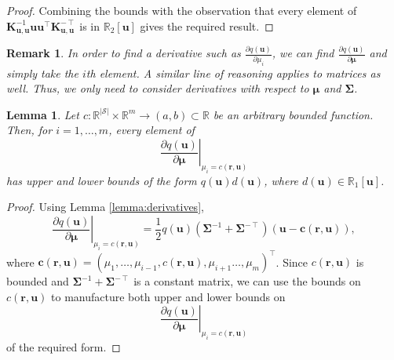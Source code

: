 \documentclass{mpaper}
\newtheorem{lemma}[theorem]{Lemma}
\newtheorem{remark}[theorem]{Remark}
\newcommand{\Kuu}{\mathbf{K}_{\mathbf{u},\mathbf{u}}}
\begin{document}
\begin{proof}
  Combining the bounds with the observation that
  every element of
  $\Kuu^{-1}\mathbf{u}\mathbf{u}^\intercal\Kuu^{-\intercal}$ is in
  $\mathbb{R}_2[\mathbf{u}]$ gives the required result.
\end{proof}

\begin{remark}
  In order to find a derivative such as $\frac{\partial q(\mathbf{u})}{\partial
    \mu_i}$, we can find $\frac{\partial q(\mathbf{u})}{\partial \bm\mu}$ and
  simply take the $i$th element. A similar line of reasoning applies to matrices
  as well. Thus, we only need to consider derivatives with respect to $\bm\mu$
  and $\bm\Sigma$.
\end{remark}

\begin{lemma} \label{lemma:bound2}
  Let $c : \mathbb{R}^{|\mathcal{S}|} \times \mathbb{R}^m \to (a, b) \subset
  \mathbb{R}$ be an arbitrary bounded function. Then, for $i = 1, \dots, m$,
  every element of
  \[
    \left. \frac{\partial q(\mathbf{u})}{\partial \bm\mu} \right|_{\mu_i =
      c(\mathbf{r}, \mathbf{u})}
  \]
  has upper and lower bounds of the form $q(\mathbf{u})d(\mathbf{u})$,
  where $d(\mathbf{u}) \in \mathbb{R}_1[\mathbf{u}]$.
\end{lemma}
\begin{proof}
  Using Lemma \ref{lemma:derivatives},
  \[
    \left. \frac{\partial q(\mathbf{u})}{\partial \bm\mu} \right|_{\mu_i =
      c(\mathbf{r}, \mathbf{u})} = \frac{1}{2}q(\mathbf{u})(\bm\Sigma^{-1} +
    \bm\Sigma^{-\intercal})(\mathbf{u} - \mathbf{c}(\mathbf{r}, \mathbf{u})),
  \]
  where $\mathbf{c}(\mathbf{r}, \mathbf{u}) = (\mu_1, \dots, \mu_{i - 1},
  c(\mathbf{r}, \mathbf{u}), \mu_{i + 1} \dots, \mu_m)^\intercal$. Since
  $c(\mathbf{r}, \mathbf{u})$ is bounded and $\bm\Sigma^{-1} +
  \bm\Sigma^{-\intercal}$ is a constant matrix, we can use the bounds on
  $c(\mathbf{r}, \mathbf{u})$ to manufacture both upper and lower bounds on
  \[
     \left. \frac{\partial q(\mathbf{u})}{\partial \bm\mu} \right|_{\mu_i =
      c(\mathbf{r}, \mathbf{u})}
  \]
  of the required form.
\end{proof}
\end{document}
